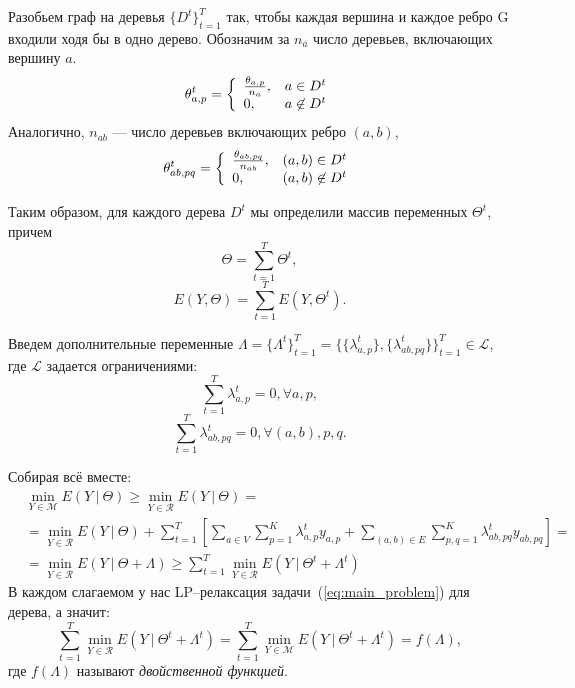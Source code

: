 \documentclass{article}
\begin{document}
Разобьем граф на деревья $\{D^t\}_{t=1}^T$ так, чтобы каждая вершина и каждое ребро G входили ходя бы в одно дерево. Обозначим за $n_a$ число деревьев, включающих вершину $a$.
\begin{equation*}
\theta_{a,p}^t = \left\{ 
\begin{array}{l l}
\frac{\theta_{a,p}}{n_a}, & a \in D^t\\
0, & a \not \in D^t
\end{array} \right.
\end{equation*}
Аналогично, $n_{ab}$ --- число деревьев включающих ребро $(a, b)$,
\begin{equation*}
\theta_{ab,pq}^t = \left\{ 
\begin{array}{l l}
\frac{\theta_{ab,pq}}{n_{ab}}, & (a,b) \in D^t\\
0, & (a,b) \not \in D^t
\end{array} \right.
\end{equation*}

Таким образом, для каждого дерева $D^t$ мы определили массив переменных $\Theta^t$, причем
\begin{equation*}
\Theta = \sum_{t = 1}^{T} \Theta^t,
\end{equation*}
\begin{equation*}
E(Y, \Theta) = \sum_{t = 1}^{T} E(Y, \Theta^t).
\end{equation*}

Введем дополнительные переменные $\Lambda = \{\Lambda^t\}_{t=1}^T = \{\{\lambda_{a,p}^t\},\{\lambda_{ab,pq}^t\}\}_{t=1}^T \in \mathcal{L}$, где $\mathcal{L}$ задается ограничениями:
\begin{equation*}
\sum_{t = 1}^{T} \lambda_{a,p}^t = 0, \forall a, p,
\end{equation*}
\begin{equation*}
\sum_{t = 1}^{T} \lambda_{ab,pq}^t = 0, \forall (a, b), p,q.
\end{equation*}

Собирая всё вместе:
\begin{align*}
&\min_{Y \in \mathcal{M}} E(Y~|~\Theta) \geq \min_{Y \in \mathcal{R}} E(Y~|~\Theta) = \\
&= \min_{Y \in \mathcal{R}} E(Y~|~\Theta) + \sum_{t = 1}^{T} \left [ \sum_{a \in V} \sum_{p = 1}^{K} \lambda_{a,p}^t y_{a,p} + \sum_{(a,b) \in E} \sum_{p,q = 1}^{K} \lambda_{ab,pq}^t y_{ab,pq} \right] = \\
&=\min_{Y \in \mathcal{R}} E(Y~|~\Theta + \Lambda) \geq \sum_{t = 1}^{T} \min_{Y \in \mathcal{R}} E(Y~|~\Theta^t + \Lambda^t)
\end{align*}
В каждом слагаемом у нас LP--релаксация задачи~(\ref{eq:main_problem}) для дерева, а значит:
\begin{equation}
\sum_{t = 1}^{T} \min_{Y \in \mathcal{R}} E(Y~|~\Theta^t + \Lambda^t) = \sum_{t = 1}^{T} \min_{Y \in \mathcal{M}} E(Y~|~\Theta^t + \Lambda^t) = f(\Lambda),
\end{equation}
где $f(\Lambda)$ называют \textit{двойственной функцией}.\\
\end{document}
